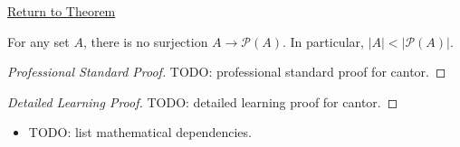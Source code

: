 \newpage
{}
\label{prf:cantor}

\begin{remark*}[Return]
\hyperref[thm:cantor]{Return to Theorem}
\end{remark*}

\begin{theorem*}
For any set $A$, there is no surjection $A \to \mathcal{P}(A)$. In
particular, $|A| < |\mathcal{P}(A)|$.
\end{theorem*}

\begin{proof}[Professional Standard Proof]
\LRAProofBodyStart
TODO: professional standard proof for cantor.
\end{proof}

\begin{proof}[Detailed Learning Proof]
\LRAProofBodyStart
TODO: detailed learning proof for cantor.
\end{proof}

\begin{remark*}
\end{remark*}

\begin{dependencies}
\begin{itemize}
  \item TODO: list mathematical dependencies.
\end{itemize}
\end{dependencies}

\clearpage
